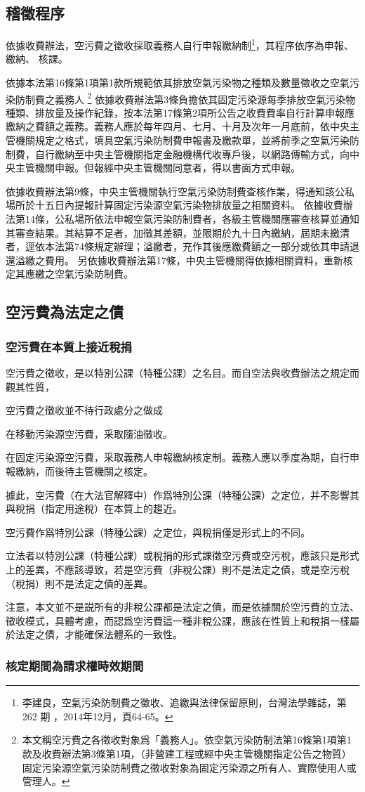 \subsection{稽徵程序}


依據收費辦法，空污費之徵收採取義務人自行申報繳納制\footnote{李建良，空氣污染防制費之徵收、追繳與法律保留原則，台灣法學雜誌，第 262 期 ，2014年12月，頁64-65。}，其程序依序為申報、 繳納、 核課。

依據本法第16條第1項第1款所規範依其排放空氣污染物之種類及數量徵收之空氣污染防制費之義務人
\footnote{本文稱空污費之各徵收對象爲「義務人」。依空氣污染防制法第16條第1項第1款及收費辦法第3條第1項，（非營建工程或經中央主管機關指定公告之物質）固定污染源空氣污染防制費之徵收對象為固定污染源之所有人、實際使用人或管理人。}
依據收費辦法第3條負擔依其固定污染源每季排放空氣污染物種類、排放量及操作紀錄，按本法第17條第2項所公告之收費費率自行計算申報應繳納之費額之義務。義務人應於每年四月、七月、十月及次年一月底前，依中央主管機關規定之格式，填具空氣污染防制費申報書及繳款單，並將前季之空氣污染防制費，自行繳納至中央主管機關指定金融機構代收專戶後，以網路傳輸方式，向中央主管機關申報。但報經中央主管機關同意者，得以書面方式申報。

依據收費辦法第9條，中央主管機關執行空氣污染防制費查核作業，得通知該公私場所於十五日內提報計算固定污染源空氣污染物排放量之相關資料。
依據收費辦法第14條，公私場所依法申報空氣污染防制費者，各級主管機關應審查核算並通知其審查結果。其結算不足者，加徵其差額，並限期於九十日內繳納，屆期未繳清者，逕依本法第74條規定辦理；溢繳者，充作其後應繳費額之一部分或依其申請退還溢繳之費用。
另依據收費辦法第17條，中央主管機關得依據相關資料，重新核定其應繳之空氣污染防制費。



\subsection{空污費為法定之債}

\subsubsection{空污費在本質上接近稅捐}

空污費之徵收，是以特別公課（特種公課）之名目。而自空法與收費辦法之規定而觀其性質，

空污費之徵收並不待行政處分之做成

在移動污染源空污費，采取隨油徵收。

在固定污染源空污費，采取義務人申報繳納核定制。義務人應以季度為期，自行申報繳納，而後待主管機關之核定。


據此，空污費（在大法官解釋中）作爲特別公課（特種公課）之定位，并不影響其與稅捐（指定用途稅）在本質上的趨近。

空污費作爲特別公課（特種公課）之定位，與稅捐僅是形式上的不同。

立法者以特別公課（特種公課）或稅捐的形式課徵空污費或空污稅，應該只是形式上的差異，不應該導致，若是空污費（非稅公課）則不是法定之債，或是空污稅（稅捐）則不是法定之債的差異。

注意，本文並不是説所有的非稅公課都是法定之債，而是依據關於空污費的立法、徵收模式，具體考慮，而認爲空污費這一種非稅公課，應該在性質上和稅捐一樣屬於法定之債，才能確保法體系的一致性。


\subsubsection{核定期間為請求權時效期間}
